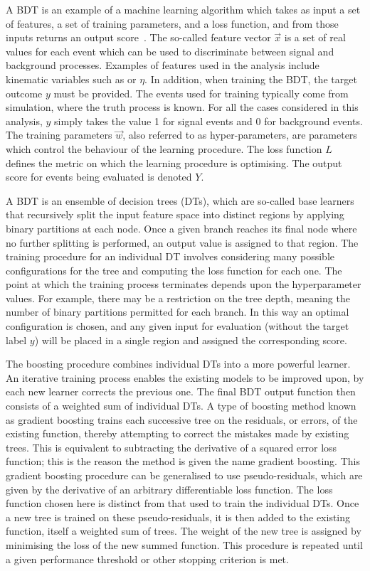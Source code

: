 A BDT is an example of a machine learning algorithm which takes as input a set of features, 
a set of training parameters, and a loss function, 
and from those inputs returns an output score~\cite{ElementsLearning}.
The so-called feature vector $\vec{x}$ is a set of real values for each event
which can be used to discriminate between signal and background processes. 
Examples of features used in the analysis include kinematic variables such as \pt or $\eta$.
In addition, when training the BDT, the target outcome $y$ must be provided.
The events used for training typically come from simulation, where the truth process is known.
For all the cases considered in this analysis, $y$ simply takes the value 1 for signal events
and 0 for background events.
The training parameters $\vec{w}$, also referred to as hyper-parameters, 
are parameters which control the behaviour of the learning procedure.
The loss function $L$ defines the metric on which the learning procedure is optimising.
The output score for events being evaluated is denoted $Y$.

A BDT is an ensemble of decision trees (DTs), 
which are so-called base learners that recursively split the input feature space into distinct regions
by applying binary partitions at each node.
Once a given branch reaches its final node where no further splitting is performed, 
an output value is assigned to that region.
The training procedure for an individual DT involves considering many possible configurations
for the tree and computing the loss function for each one.
The point at which the training process terminates depends upon the hyperparameter values.
For example, there may be a restriction on the tree depth, 
meaning the number of binary partitions permitted for each branch.
In this way an optimal configuration is chosen, 
and any given input for evaluation (without the target label $y$) 
will be placed in a single region and assigned the corresponding score.

The boosting procedure combines individual DTs into a more powerful learner.
An iterative training process enables the existing models to be improved upon, 
by each new learner corrects the previous one.
The final BDT output function then consists of a weighted sum of individual DTs.
A type of boosting method known as gradient boosting trains each successive tree 
on the residuals, or errors, of the existing function, 
thereby attempting to correct the mistakes made by existing trees.
This is equivalent to subtracting the derivative of a squared error loss function;
this is the reason the method is given the name gradient boosting.
This gradient boosting procedure can be generalised to use pseudo-residuals, 
which are given by the derivative of an arbitrary differentiable loss function.
The loss function chosen here is distinct from that used to train the individual DTs.
Once a new tree is trained on these pseudo-residuals, it is then added to the existing function, 
itself a weighted sum of trees.
The weight of the new tree is assigned by minimising the loss of the new summed function.
This procedure is repeated until a given performance threshold or other stopping criterion is met.

